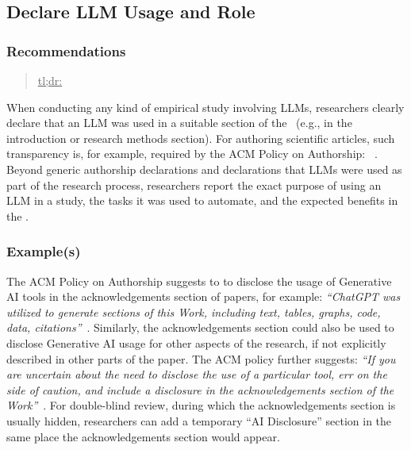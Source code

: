 



\subsection{Declare LLM Usage and Role}

\subsubsection{Recommendations}

\begin{quote}
\underline{tl;dr:}  
\end{quote}

When conducting any kind of empirical study involving LLMs, researchers \must clearly declare that an LLM was used in a suitable section of the \paper~(e.g., in the introduction or research methods section).
For authoring scientific articles, such transparency is, for example, required by the ACM Policy on Authorship: ~\cite{ACM2023}.
Beyond generic authorship declarations and declarations that LLMs were used as part of the research process, researchers \should report the exact purpose of using an LLM in a study, the tasks it was used to automate, and the expected benefits in the \paper.


\subsubsection{Example(s)}

The ACM Policy on Authorship suggests to to disclose the usage of Generative AI tools in the acknowledgements section of papers, for example: \emph{``ChatGPT was utilized to generate sections of this Work, including text, tables, graphs, code, data, citations''}~\cite{ACM2023}. 
Similarly, the acknowledgements section could also be used to disclose Generative AI usage for other aspects of the research, if not explicitly described in other parts of the paper.
The ACM policy further suggests: \emph{``If you are uncertain ­about the need to disclose the use of a particular tool, err on the side of caution, and include a disclosure in the acknowledgements section of the Work''}~\cite{ACM2023}.
For double-blind review, during which the acknowledgements section is usually hidden, researchers can add a temporary ``AI Disclosure'' section in the same place the acknowledgements section would appear. 

